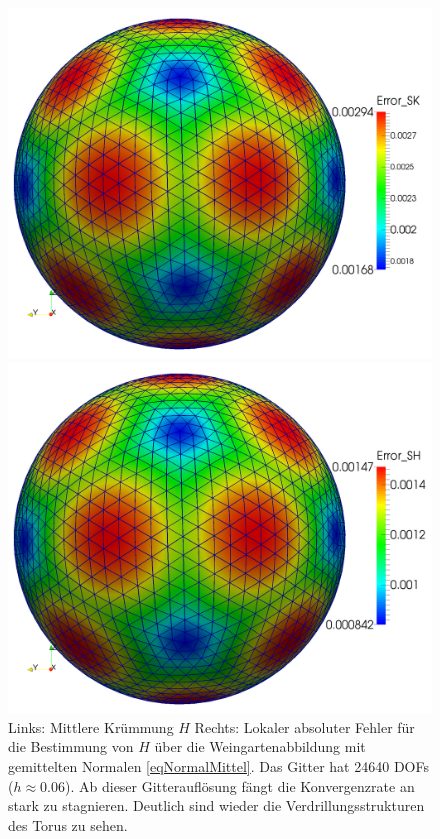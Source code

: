 \begin{figure}
\begin{minipage}[t]{0.49\textwidth}
        \end{minipage}
        \caption[Mittlere Krümmung aus Weingartenabb. auf Torus]
                {Links: Mittlere Krümmung \( H \)
                 Rechts: Lokaler absoluter Fehler für die Bestimmung von \( H \) über die Weingartenabbildung mit gemittelten Normalen
                 \eqref{eqNormalMittel}. Das Gitter hat 24640 DOFs (\( h\approx 0.06 \)). 
                 Ab dieser Gitterauflösung fängt die Konvergenzrate an stark zu stagnieren.
                 Deutlich sind wieder die Verdrillungsstrukturen des Torus zu sehen.}
       \label{figMeanTorus}
    \begin{minipage}[t]{0.49\textwidth}
       \centering\includegraphics[width=\textwidth]{bilder/Curvature/sphere/ErrSK2k.png}
    \end{minipage}\hfill
    \begin{minipage}[t]{0.49\textwidth}
       \centering\includegraphics[width=\textwidth]{bilder/Curvature/sphere/ErrSH2k.png}

\end{minipage}
\end{figure}
